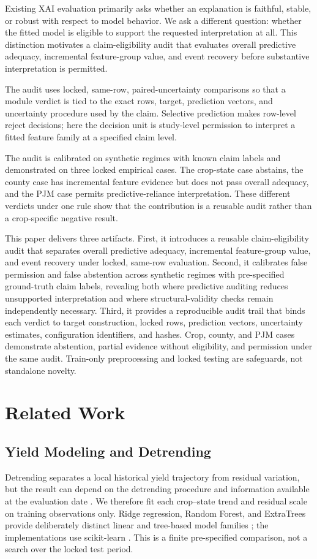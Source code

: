 \documentclass[conference]{IEEEtran}
\begin{document}
Existing XAI evaluation primarily asks whether an explanation is faithful, stable,
or robust with respect to model behavior. We ask a different question: whether the
fitted model is eligible to support the requested interpretation at all. This
distinction motivates a claim-eligibility audit that evaluates overall predictive
adequacy, incremental feature-group value, and event recovery before substantive
interpretation is permitted.

The audit uses locked, same-row, paired-uncertainty comparisons so that a module
verdict is tied to the exact rows, target, prediction vectors, and uncertainty
procedure used by the claim. Selective prediction makes row-level reject
decisions; here the decision unit is study-level permission to interpret a fitted
feature family at a specified claim level.

The audit is calibrated on synthetic regimes with known claim labels and
demonstrated on three locked empirical cases. The crop-state case abstains, the
county case has incremental feature evidence but does not pass overall adequacy,
and the PJM case permits predictive-reliance interpretation. These different
verdicts under one rule show that the contribution is a reusable audit rather
than a crop-specific negative result.

This paper delivers three artifacts. First, it introduces a reusable
claim-eligibility audit that separates overall predictive adequacy, incremental
feature-group value, and event recovery under locked, same-row evaluation. Second,
it calibrates false permission and false abstention across synthetic regimes with
pre-specified ground-truth claim labels, revealing both where predictive auditing
reduces unsupported interpretation and where structural-validity checks remain
independently necessary. Third, it provides a reproducible audit trail that binds
each verdict to target construction, locked rows, prediction vectors, uncertainty
estimates, configuration identifiers, and hashes. Crop, county, and PJM cases
demonstrate abstention, partial evidence without eligibility, and permission under
the same audit. Train-only preprocessing and locked testing are safeguards, not
standalone novelty.

\section{Related Work}
\subsection{Yield Modeling and Detrending}
Detrending separates a local historical yield trajectory from residual variation,
but the result can depend on the detrending procedure and information available at
the evaluation date \cite{Lu2017,Meng2024}. We therefore fit each crop--state trend
and residual scale on training observations only. Ridge regression, Random Forest,
and ExtraTrees provide deliberately distinct linear and tree-based model families
\cite{HoerlKennard1970,Breiman2001,Geurts2006}; the implementations use
scikit-learn \cite{Pedregosa2011}. This is a finite pre-specified comparison, not
a search over the locked test period.
\end{document}
